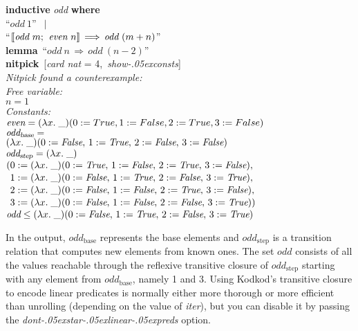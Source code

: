\documentclass[a4paper,12pt]{article}
\def\unk{{\_}}
\def\unkef{(\lambda x.\; \unk)}
\renewcommand\_{\hbox{\textunderscore\kern-.05ex}}
\begin{document}
\prew
\textbf{inductive} \textit{odd} \textbf{where} \\
``$\textit{odd}~1$'' $\,\mid$ \\
``$\mathopen{[\![} \textit{odd}~m;\>\, \textit{even}~n\mathclose{]\!]} \,\Longrightarrow\, \textit{odd}~(m + n)$'' \\[2\smallskipamount]
\textbf{lemma}~``$\textit{odd}~n \,\Longrightarrow\, \textit{odd}~(n - 2)$'' \\
\textbf{nitpick}~[\textit{card nat} = 4,\, \textit{show\_consts}] \\[2\smallskipamount]
\slshape Nitpick found a counterexample:
\\[2\smallskipamount]
\hbox{}\qquad Free variable: \nopagebreak \\
\hbox{}\qquad\qquad $n = 1$ \\
\hbox{}\qquad Constants: \nopagebreak \\
\hbox{}\qquad\qquad $\textit{even} = \unkef(0 := True, 1 := False, 2 := True, 3 := False)$ \\
\hbox{}\qquad\qquad $\textit{odd}_{\textsl{base}} = {}$ \\
\hbox{}\qquad\qquad\quad $\unkef(0 := \textit{False},\, 1 := \textit{True},\, 2 := \textit{False},\, 3 := \textit{False})$ \\
\hbox{}\qquad\qquad $\textit{odd}_{\textsl{step}} = \unkef$\\
\hbox{}\qquad\qquad\quad $(
\!\begin{aligned}[t]
& 0 := \unkef(0 := \textit{True},\, 1 := \textit{False},\, 2 := \textit{True},\, 3 := \textit{False}), \\[-2pt]
& 1 := \unkef(0 := \textit{False},\, 1 := \textit{True},\, 2 := \textit{False},\, 3 := \textit{True}), \\[-2pt]
& 2 := \unkef(0 := \textit{False},\, 1 := \textit{False},\, 2 := \textit{True},\, 3 := \textit{False}), \\[-2pt]
& 3 := \unkef(0 := \textit{False},\, 1 := \textit{False},\, 2 := \textit{False},\, 3 := \textit{True}))
\end{aligned}$ \\
\hbox{}\qquad\qquad $\textit{odd} \leq \unkef(0 := \textit{False},\, 1 := \textit{True},\, 2 := \textit{False},\, 3 := \textit{True})$
\postw

\noindent
In the output, $\textit{odd}_{\textrm{base}}$ represents the base elements and
$\textit{odd}_{\textrm{step}}$ is a transition relation that computes new
elements from known ones. The set $\textit{odd}$ consists of all the values
reachable through the reflexive transitive closure of
$\textit{odd}_{\textrm{step}}$ starting with any element from
$\textit{odd}_{\textrm{base}}$, namely 1 and 3. Using Kodkod's
transitive closure to encode linear predicates is normally either more thorough
or more efficient than unrolling (depending on the value of \textit{iter}), but
you can disable it by passing the \textit{dont\_star\_linear\_preds} option.
\end{document}
